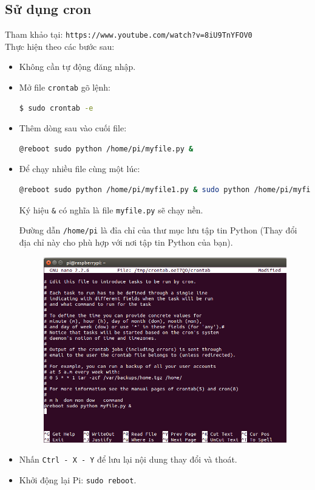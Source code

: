 \subsection{Sử dụng cron}
Tham khảo tại: \verb|https://www.youtube.com/watch?v=8iU9TnYFOV0|\\
Thực hiện theo các bước sau:
\begin{itemize}
\item Không cần tự động đăng nhập.
\item Mở file \verb|crontab| gõ lệnh:
\begin{lstlisting}[language=bash]
$ sudo crontab -e
\end{lstlisting}
\item Thêm dòng sau vào cuối file: 
\begin{lstlisting}[language=bash]
@reboot sudo python /home/pi/myfile.py &
\end{lstlisting}
\item Để chạy nhiều file cùng một lúc:
\begin{lstlisting}[language=bash]
@reboot sudo python /home/pi/myfile1.py & sudo python /home/pi/myfile2.py & 
\end{lstlisting}
Ký hiệu \verb|&| có nghĩa là file \verb|myfile.py| sẽ chạy nền.

Đường dẫn \verb|/home/pi| là đỉa chỉ của thư mục lưu tập tin Python (Thay đổi địa chỉ này cho phù hợp với nơi tập tin Python của bạn).
\begin{figure}[h!]
\begin{center}
\includegraphics[scale=.5]{run-script-python/images/auto-run-python-1}
\end{center}
\end{figure}
\item Nhấn \verb|Ctrl - X - Y| để lưu lại nội dung thay đổi và thoát.
\item Khởi động lại Pi: \verb|sudo reboot|.
\end{itemize}
